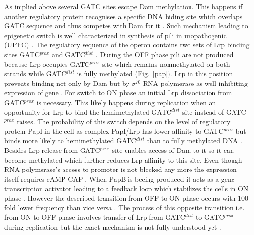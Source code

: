 As implied above several GATC sites escape Dam methylation.
This happens if another regulatory protein recognises a specific DNA biding site which overlaps GATC sequence and thus competes with Dam for it \cite{correnti2002dam}.
Such mechanism leading to epigenetic switch is well characterized in synthesis of  pili in uropathogenic  (UPEC) \cite{peterson2008competitive}.
The regulatory sequence of the  operon contains two sets of Lrp binding sites GATC$^{prox}$ and GATC$^{dist}$ \cite{blyn1990regulation}.
During the OFF phase  pili are not produced because Lrp occupies GATC$^{prox}$ site which remains nonmethylated on both strands while GATC$^{dist}$ is fully methylated (Fig.~\ref{pap}).
Lrp in this position prevents binding not only by Dam but by $\sigma^{70}$ RNA polymerase as well inhibiting expression of  gene \cite{weyand2000regulation}.
For switch to ON phase an initial Lrp dissociation from GATC$^{prox}$ is necessary.
This likely happens during replication when an opportunity for Lrp to bind the hemimethylated GATC$^{dist}$ site instead of GATC$^{prox}$ raises.
The probability of this switch depends on the level of regulatory protein PapI in the cell as complex PapI/Lrp has lower affinity to GATC$^{prox}$ but binds more likely to hemimethylated GATC$^{dist}$ than to fully methylated DNA \cite{hernday2003mechanism}.
Besides Lrp release from GATC$^{prox}$ site enables access of Dam to it so it can become methylated which further reduces Lrp affinity to this site.
Even though RNA polymerase's access to  promoter is not blocked any more the expression itself requires cAMP-CAP \cite{weyand2001essential}.
When PapB is beeing produced it acts as a  gene transcription activator leading to a feedback loop which stabilizes the cells in ON phase \cite{forsman1989autoregulation}.
However the described transition from OFF to ON phase occurs with 100-fold lower frequency than vice versa \cite{blyn1990regulation}.
The process of this opposite transition i.e. from ON to OFF phase involves transfer of Lrp from GATC$^{dist}$ to GATC$^{prox}$ during replication but the exact mechanism is not fully understood yet \cite{adhikari2016dna}.

